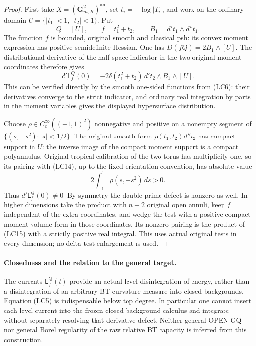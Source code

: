 \documentclass[11pt,a4paper]{article}
\numberwithin{equation}{section}
\theoremstyle{definition}
\theoremstyle{remark}
\begin{document}
\begin{proof}
First take $X=(\mathbf G_{m,K}^2)^{\mathrm{an}}$, set
$t_i=-\log|T_i|$, and work on the ordinary domain
$U=\{|t_1|<1,\ |t_2|<1\}$.  Put
\[
 Q=[U],\qquad f=t_1^2+t_2,\qquad
 B_1=d't_1\wedge d''t_1.
 \tag{LC13}
\]
The function $f$ is bounded, original smooth and classical psh:
its convex moment expression has positive semidefinite Hessian.
One has $D(fQ)=2B_1\wedge[U]$.  The distributional derivative of
the half-space indicator in the two original moment coordinates
therefore gives
\[
 d'\mathsf L_f^Q(0)
 =-2\delta(t_1^2+t_2)\,d't_2\wedge B_1\wedge[U].
 \tag{LC14}
\]
This can be verified directly by the smooth one-sided functions
from (LC6): their derivatives converge to the strict indicator,
and ordinary real integration by parts in the moment variables
gives the displayed hypersurface distribution.

Choose $\rho\in C_c^\infty((-1,1)^2)$ nonnegative and positive
on a nonempty segment of $\{(s,-s^2):|s|<1/2\}$.
The original smooth form $\rho(t_1,t_2)d''t_2$ has compact
support in $U$: the inverse image of the compact moment support
is a compact polyannulus.  Original tropical calibration of the
two-torus has multiplicity one, so its pairing with (LC14),
up to the fixed orientation convention, has absolute value
\[
 2\int_{-1}^{1}\rho(s,-s^2)\,ds>0.
 \tag{LC15}
\]
Thus $d'\mathsf L_f^Q(0)\ne0$.  By symmetry the double-prime
defect is nonzero as well.  In higher dimensions take the product
with $n-2$ original open annuli, keep $f$ independent of the extra
coordinates, and wedge the test with a positive compact moment
volume form in those coordinates.  Its nonzero pairing is the
product of (LC15) with a strictly positive real integral.  This
uses actual original tests in every dimension; no delta-test
enlargement is used.
\end{proof}

\paragraph{Closedness and the relation to the general target.}
The currents $\mathsf L^Q_f(t)$ provide an actual level
disintegration of energy, rather than a disintegration of an
arbitrary BT curvature measure into closed backgrounds.
Equation (LC5) is indispensable below top degree.  In particular
one cannot insert each level current into the frozen closed-background
calculus and integrate without separately resolving that derivative
defect.  Neither general OPEN-GQ nor general Borel regularity of
the raw relative BT capacity is inferred from this construction.
\end{document}
